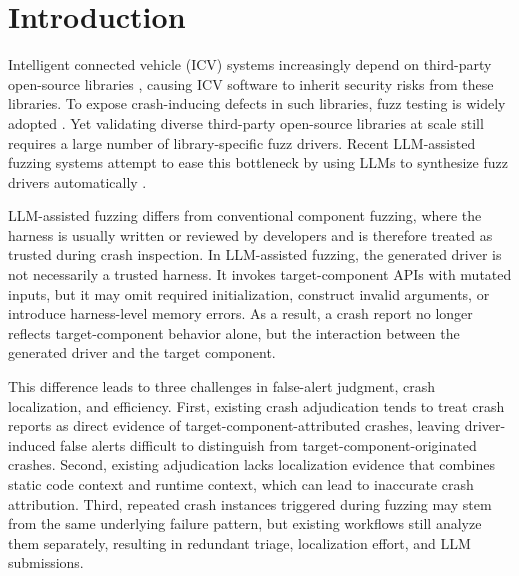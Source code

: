 \documentclass[pdflatex,sn-basic]{sn-jnl}%
\theoremstyle{thmstyleone}%
\theoremstyle{thmstyletwo}%
\theoremstyle{thmstylethree}%
\begin{document}

\maketitle


\section{Introduction}
\label{sec:introduction}

Intelligent connected vehicle (ICV) systems increasingly depend on third-party open-source libraries \citep{ref1,ref2,ref3,ref4,ref32}, causing ICV software to inherit security risks from these libraries. To expose crash-inducing defects in such libraries, fuzz testing is widely adopted \citep{ref16,ref17,ref7}. Yet validating diverse third-party open-source libraries at scale still requires a large number of library-specific fuzz drivers. Recent LLM-assisted fuzzing systems attempt to ease this bottleneck by using LLMs to synthesize fuzz drivers automatically \citep{ref8,ref9,ref10,ref11,ref12}.

LLM-assisted fuzzing differs from conventional component fuzzing, where the harness is usually written or reviewed by developers and is therefore treated as trusted during crash inspection. In LLM-assisted fuzzing, the generated driver is not necessarily a trusted harness. It invokes target-component APIs with mutated inputs, but it may omit required initialization, construct invalid arguments, or introduce harness-level memory errors. As a result, a crash report no longer reflects target-component behavior alone, but the interaction between the generated driver and the target component.

This difference leads to three challenges in false-alert judgment, crash localization, and efficiency. First, existing crash adjudication tends to treat crash reports as direct evidence of target-component-attributed crashes, leaving driver-induced false alerts difficult to distinguish from target-component-originated crashes. Second, existing adjudication lacks localization evidence that combines static code context and runtime context, which can lead to inaccurate crash attribution. Third, repeated crash instances triggered during fuzzing may stem from the same underlying failure pattern, but existing workflows still analyze them separately, resulting in redundant triage, localization effort, and LLM submissions.
\end{document}
